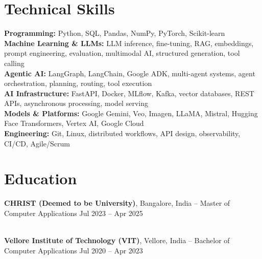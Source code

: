 \documentclass[letterpaper,10.5pt]{article}
\begin{document}
\section{Technical Skills}
\begin{itemize}[leftmargin=0.19in, label={}]
\small{\item{

\textbf{Programming:}
Python, SQL, Pandas, NumPy, PyTorch, Scikit-learn
\\[2pt]

\textbf{Machine Learning \& LLMs:}
LLM inference, fine-tuning, RAG, embeddings, prompt engineering, evaluation, multimodal AI, structured generation, tool calling
\\[2pt]

\textbf{Agentic AI:}
LangGraph, LangChain, Google ADK, multi-agent systems, agent orchestration, planning, routing, tool execution
\\[2pt]

\textbf{AI Infrastructure:}
FastAPI, Docker, MLflow, Kafka, vector databases, REST APIs, asynchronous processing, model serving
\\[2pt]

\textbf{Models \& Platforms:}
Google Gemini, Veo, Imagen, LLaMA, Mistral, Hugging Face Transformers, Vertex AI, Google Cloud
\\[2pt]

\textbf{Engineering:}
Git, Linux, distributed workflows, API design, observability, CI/CD, Agile/Scrum

}}
\end{itemize}

\section{Education}
\begin{itemize}[leftmargin=0.19in, label={}]
\small{\item{

\textbf{CHRIST (Deemed to be University)}, Bangalore, India
-- Master of Computer Applications
\hfill Jul 2023 -- Apr 2025

\\[2pt]

\textbf{Vellore Institute of Technology (VIT)}, Vellore, India
-- Bachelor of Computer Applications
\hfill Jul 2020 -- Apr 2023

}}
\end{itemize}

\end{document}
